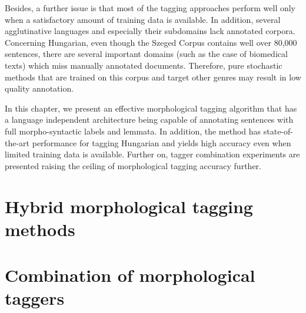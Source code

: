 Besides, a further issue is that most of the tagging approaches perform well only when a satisfactory amount of training data is available. 
In addition, several agglutinative languages and especially their subdomains lack annotated corpora. 
Concerning Hungarian, even though the Szeged Corpus contains well over 80,000 sentences, there are several important domains (such as the case of biomedical texts) which miss manually annotated documents. 
Therefore, pure stochastic methods that are trained on this corpus and target other genres may result in low quality annotation. 

In this chapter, we present an effective morphological tagging algorithm that has a language independent architecture being capable of annotating sentences with full morpho-syntactic labels and lemmata. 
In addition, the method has state-of-the-art performance for tagging Hungarian and yields high accuracy even when limited training data is available. 
Further on, tagger combination experiments are presented raising the ceiling of morphological tagging accuracy further. 

\section{Hybrid morphological tagging methods}\label{sec:tagging}



\section{Combination of morphological taggers}\label{sec:combination}


 
